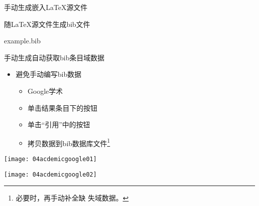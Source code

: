 \documentclass[fontset = none, t]{ctexbeamer}
\begin{document}
\begin{frame}[fragile]{手动生成}{嵌入\LaTeX 源文件}
\begin{spacing}{1.3}
\begin{center}
\begin{minipage}[h]{0.55\linewidth}
\begin{textcb}{随\LaTeX 源文件生成bib文件}
\begin{filecontents}{example.bib}
\begin{frame}[fragile]{手动生成}{自动获取bib条目域数据}
  \begin{spacing}{1.5}
    \begin{itemize}
    \item 避免手动编写bib数据
      \begin{itemize}
      \item Google学术
      \item 单击结果条目下的\alert{}按钮
      \item 单击\enquote{引用}中的\alert{}按钮
      \item 拷贝数据到bib数据库文件\footnote[frame,2]{必要时，再手动补全缺
          失域数据。}
      \end{itemize}
    \end{itemize}    
    \begin{center}
      \begin{annotatedFigure}
        {\texttt{[image: 04acdemicgoogle01]}}
      \end{annotatedFigure}\quad
      \begin{annotatedFigure}
        {\texttt{[image: 04acdemicgoogle02]}}
      \end{annotatedFigure}
    \end{center}
  \end{spacing}
\end{frame}


\end{filecontents}
\end{textcb}
\end{minipage}
\end{center}
\end{spacing}
\end{frame}
\end{document}
